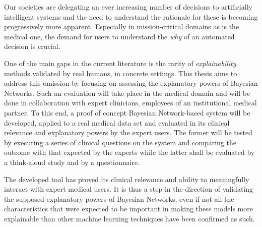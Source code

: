 Our societies are delegating an ever increasing number of decisions to artificially intelligent systems and the need to understand the rationale for these is becoming progressively more apparent.
Especially in mission-critical domains as is the medical one, the demand for users to understand the \textit{why} of an automated decision is crucial.

One of the main gaps in the current literature is the rarity of \textit{explainability} methods validated by real humans, in concrete settings.
This thesis aims to address this omission by focusing on assessing the explanatory powers of Bayesian Networks.
Such an evaluation will take place in the medical domain and will be done in collaboration with expert clinicians, employees of an institutional medical partner.
To this end, a proof of concept Bayesian Network-based system will be developed, applied to a real medical data set and evaluated in its clinical relevance and explanatory powers by the expert users.
The former will be tested by executing a series of clinical questions on the system and comparing the outcome with that expected by the experts while the latter shall be evaluated by a think-aloud study and by a questionnaire.

The developed tool has proved its clinical relevance and ability to meaningfully interact with expert medical users.
It is thus a step in the direction of validating the supposed explanatory powers of Bayesian Networks, even if not all the characteristics that were expected to be important in making these models more explainable than other machine learning techniques have been confirmed as such.